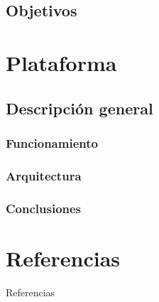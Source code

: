 \documentclass{beamer}
\begin{document}
\subsection{Objetivos}

\section{Plataforma}
\subsection{Descripción general}
\subsubsection{Funcionamiento}
\subsubsection{Arquitectura}
\begin{frame}
\frametitle{Conclusiones}
\end{frame}

\section{Referencias}
\begin{frame}[allowframebreaks]{Referencias}


\printbibliography
\end{frame}
\end{document}
